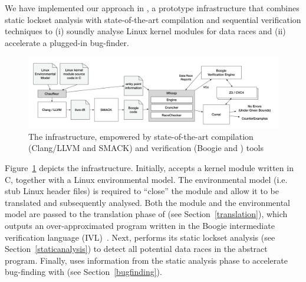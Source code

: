 We have implemented our approach in \whoop, a prototype infrastructure that combines static lockset analysis with state-of-the-art compilation and sequential verification techniques to (i) soundly analyse Linux kernel modules for data races and (ii) accelerate a plugged-in bug-finder.

\begin{figure}
\centering
\includegraphics[width=.99\linewidth]{img/whoop.pdf}
\caption{The \whoop infrastructure, empowered by state-of-the-art compilation (Clang/LLVM and SMACK) and verification (Boogie and \corral) tools}
\label{fig:whoop}
\end{figure}

Figure~\ref{fig:whoop} depicts the \whoop infrastructure. Initially, \whoop accepts a kernel module written in C, together with a Linux environmental model. The environmental model (i.e. stub Linux header files) is required to ``close'' the module and allow it to be translated and subsequently analysed. Both the module and the environmental model are passed to the translation phase of \whoop (see Section~\ref{translation}), which outputs an over-approximated program written in the Boogie intermediate verification language (IVL)~\cite{deline2005boogiepl}. Next, \whoop performs its static lockset analysis (see Section~\ref{staticanalysis}) to detect all potential data races in the abstract program. Finally, \whoop uses information from the static analysis phase to accelerate bug-finding with \corral (see Section~\ref{bugfinding}).